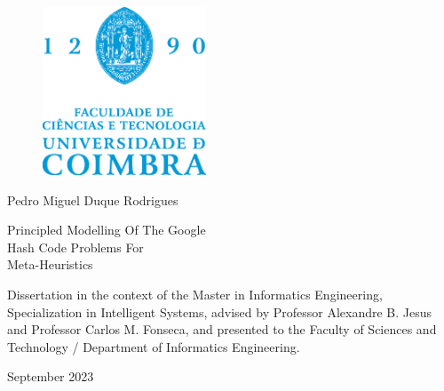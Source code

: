 \thispagestyle{empty}

\begin{center}
  \vspace*{\fill}

  \begin{figure}[h!]
    \centering
    \includegraphics[height=5cm, keepaspectratio]{../assets/cover/fctuc-logo.eps}
  \end{figure}

  \vspace{\fill}

  \large{Pedro Miguel Duque Rodrigues}

  \vspace*{\fill}

  \LARGE{\sffamily Principled Modelling Of The Google \\ Hash Code Problems For \\ Meta-Heuristics}

  \vspace*{\fill}

  \normalsize{
    Dissertation in the context of the Master in Informatics Engineering,
    Specialization in Intelligent Systems, advised by Professor Alexandre B. Jesus
    and Professor Carlos M. Fonseca, and presented to the Faculty of
    Sciences and Technology / Department of Informatics Engineering.
  }

  \vspace{\fill}

  \normalsize{\centering September 2023}

  \vspace*{\fill}
\end{center}

\cleardoublepage